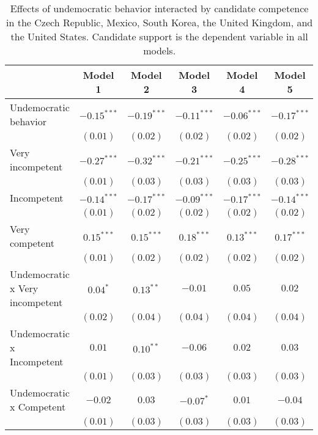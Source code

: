 
\begin{table}[!htbp]
\caption{Effects of undemocratic behavior interacted by candidate competence in the Czech Republic, Mexico, South Korea, the United Kingdom, and the United States. Candidate support is the dependent variable in all models.}
\begin{center}
\begin{tabular}{l c c c c c}
\hline
 & Model 1 & Model 2 & Model 3 & Model 4 & Model 5 \\
\hline
Undemocratic behavior           & $-0.15^{***}$ & $-0.19^{***}$ & $-0.11^{***}$ & $-0.06^{***}$ & $-0.17^{***}$ \\
                                & $(0.01)$      & $(0.02)$      & $(0.02)$      & $(0.02)$      & $(0.02)$      \\
Very incompetent                & $-0.27^{***}$ & $-0.32^{***}$ & $-0.21^{***}$ & $-0.25^{***}$ & $-0.28^{***}$ \\
                                & $(0.01)$      & $(0.03)$      & $(0.03)$      & $(0.03)$      & $(0.03)$      \\
Incompetent                     & $-0.14^{***}$ & $-0.17^{***}$ & $-0.09^{***}$ & $-0.17^{***}$ & $-0.14^{***}$ \\
                                & $(0.01)$      & $(0.02)$      & $(0.02)$      & $(0.02)$      & $(0.02)$      \\
Very competent                  & $0.15^{***}$  & $0.15^{***}$  & $0.18^{***}$  & $0.13^{***}$  & $0.17^{***}$  \\
                                & $(0.01)$      & $(0.02)$      & $(0.02)$      & $(0.02)$      & $(0.02)$      \\
Undemocratic x Very incompetent & $0.04^{*}$    & $0.13^{**}$   & $-0.01$       & $0.05$        & $0.02$        \\
                                & $(0.02)$      & $(0.04)$      & $(0.04)$      & $(0.04)$      & $(0.04)$      \\
Undemocratic x Incompetent      & $0.01$        & $0.10^{**}$   & $-0.06$       & $0.02$        & $0.03$        \\
                                & $(0.01)$      & $(0.03)$      & $(0.03)$      & $(0.03)$      & $(0.03)$      \\
Undemocratic x Competent        & $-0.02$       & $0.03$        & $-0.07^{*}$   & $0.01$        & $-0.04$       \\
                                & $(0.01)$      & $(0.03)$      & $(0.03)$      & $(0.03)$      & $(0.03)$      \\

\end{tabular}
\end{center}
\end{table}
